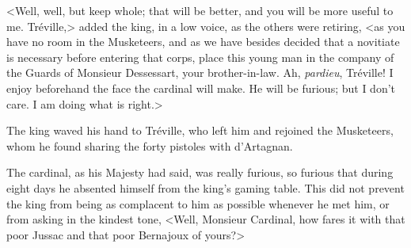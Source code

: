 <Well, well, but keep whole; that will be better, and you will be more useful to me. Tréville,> added the king, in a low voice, as the others were retiring, <as you have no room in the Musketeers, and as we have besides decided that a novitiate is necessary before entering that corps, place this young man in the company of the Guards of Monsieur Dessessart, your brother-in-law. Ah, \textit{pardieu}, Tréville! I enjoy beforehand the face the cardinal will make. He will be furious; but I don't care. I am doing what is right.> 

The king waved his hand to Tréville, who left him and rejoined the Musketeers, whom he found sharing the forty pistoles with d'Artagnan. 

The cardinal, as his Majesty had said, was really furious, so furious that during eight days he absented himself from the king's gaming table. This did not prevent the king from being as complacent to him as possible whenever he met him, or from asking in the kindest tone, <Well, Monsieur Cardinal, how fares it with that poor Jussac and that poor Bernajoux of yours?>